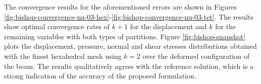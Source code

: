 \documentclass[english,11pt,3p,number,sort&compress]{elsarticle}
\begin{document}

The convergence results for the aforementioned errors are shown in Figures \ref{fig:bishop-convergence-nu-03-hex}-\ref{fig:bishop-convergence-nu-03-tet}. The results show optimal convergence rates of $k+1$ for the displacement and $k$ for the remaining variables with both types of partitions. Figure \ref{fig:bishop-snapshot} plots the displacement, pressure, normal and shear stresses distributions obtained with the finest hexahedral mesh using $k=2$ over the deformed configuration of the beam. The results qualitatively agress with the reference solution, which is a strong indication of the accuracy of the proposed formulation.


\end{document}
